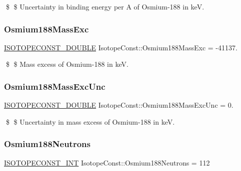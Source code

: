 \$ \$ Uncertainty in binding energy per A of Osmium-\/188 in keV. \mbox{\label{group___isotope_const-_osmium-_os188_ga293bd58342cf3fa9e8d7bc40bb35282d}} 
\subsubsection{\texorpdfstring{Osmium188\+Mass\+Exc}{Osmium188MassExc}}
{\footnotesize\ttfamily \mbox{\hyperlink{group___isotope_const-_macros_ga8f45a7272ce02c0b4c65c44636ed719a}{I\+S\+O\+T\+O\+P\+E\+C\+O\+N\+S\+T\+\_\+\+D\+O\+U\+B\+LE}} Isotope\+Const\+::\+Osmium188\+Mass\+Exc = -\/41137.}

\$ \$ Mass excess of Osmium-\/188 in keV. \mbox{\label{group___isotope_const-_osmium-_os188_ga984c14ce4736c89cfdd1858388d4ba3d}} 
\subsubsection{\texorpdfstring{Osmium188\+Mass\+Exc\+Unc}{Osmium188MassExcUnc}}
{\footnotesize\ttfamily \mbox{\hyperlink{group___isotope_const-_macros_ga8f45a7272ce02c0b4c65c44636ed719a}{I\+S\+O\+T\+O\+P\+E\+C\+O\+N\+S\+T\+\_\+\+D\+O\+U\+B\+LE}} Isotope\+Const\+::\+Osmium188\+Mass\+Exc\+Unc = 0.}

\$ \$ Uncertainty in mass excess of Osmium-\/188 in keV. \mbox{\label{group___isotope_const-_osmium-_os188_gae97f1a5747905afd77985272f77cf2b5}} 
\subsubsection{\texorpdfstring{Osmium188\+Neutrons}{Osmium188Neutrons}}
{\footnotesize\ttfamily \mbox{\hyperlink{group___isotope_const-_macros_ga5f18360b3e99483a35c32d789e62621c}{I\+S\+O\+T\+O\+P\+E\+C\+O\+N\+S\+T\+\_\+\+I\+NT}} Isotope\+Const\+::\+Osmium188\+Neutrons = 112}

